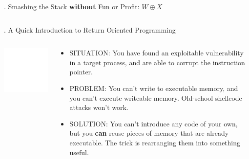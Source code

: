 \documentclass[9pt]{beamer}
\begin{document}
\begin{frame}{\theframenumber. Smashing the Stack \textbf{without} Fun or Profit: $W\oplus X$}
\begin{columns}
\begin{column}{.5\textwidth}
    \end{column}
  \end{columns}
\end{frame}


\begin{frame}{\theframenumber. A Quick Introduction to Return Oriented Programming}
  \begin{columns}
    \begin{column}{.4\textwidth}
      \includegraphics[width=\textwidth]{../images/macgyver-transparent.png}
    \end{column}
    \begin{column}{.6\textwidth}
      \begin{itemize}
      \item SITUATION: You have found an exploitable vulnerability in a target process, and are able to corrupt the instruction pointer.
        \item PROBLEM: You can't write to executable memory, and you can't execute writeable memory. Old-school shellcode attacks won't work. 
        \item SOLUTION: You can't introduce any code of your own, but you \textbf{can} reuse pieces of memory that are already executable. The trick is rearranging them into something useful.
      \end{itemize}
    \end{column}
    \end{columns}
\end{frame}
\end{document}
